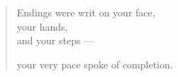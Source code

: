 \documentclass[11pt]{memoir}
\begin{document}
  \begin{paracol}{2}
  \begin{leftcolumn}
  
  \end{leftcolumn}
  \end{paracol}

  \null
  \newpage
  \null
  \vfill
  \begin{verse}
    Endings were writ on your face,\\
    \vin your hands,\\
    \vin \vin and your steps ---

    your very pace spoke of completion.
  \end{verse}
  \vfill
  \newpage

  \backmatter
  \pagestyle{empty}
  
\end{document}
